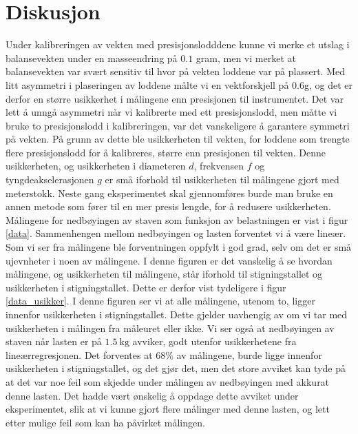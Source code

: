 \documentclass[%
 reprint,
 amsmath,amssymb,
 aps,
 norsk,
 booktabs
]{revtex4-1}
\begin{document}
\section{Diskusjon}
Under kalibreringen av vekten med presisjonslodddene kunne vi merke et utslag i balansevekten under en masseendring på $0.1$ gram, men vi merket at balansevekten var svært sensitiv til hvor på vekten loddene var på plassert. Med litt asymmetri i plaseringen av loddene målte vi en vektforskjell på $0.6$g, og det er derfor en større usikkerhet i målingene enn presisjonen til instrumentet. Det var lett å unngå asymmetri når vi kalibrerte med ett presisjonslodd, men måtte vi bruke to presisjonslodd i kalibreringen, var det vanskeligere å garantere symmetri på vekten. På grunn av dette ble usikkerheten til vekten, for loddene som trengte flere presisjonslodd for å kalibreres, større enn presisjonen til vekten. Denne usikkerheten, og usikkerheten i diameteren $d$, frekvensen $f$ og tyngdeakselerasjonen $g$ er små iforhold til usikkerheten til målingene gjort med meterstokk. Neste gang eksperimentet skal gjennomføres burde man bruke en annen metode som fører til en mer presis lengde, for å redusere usikkerheten.\\
Målingene for nedbøyingen av staven som funksjon av belastningen er vist i figur \vref{data}. Sammenhengen mellom nedbøyingen og lasten forventet vi å være lineær. Som vi ser fra målingene ble forventningen oppfylt i god grad, selv om det er små ujevnheter i noen av målingene. I denne figuren er det vanskelig å se hvordan målingene, og usikkerheten til målingene, står iforhold til stigningstallet og usikkerheten i stigningstallet. Dette er derfor vist tydeligere i figur \vref{data_usikker}. I denne figuren ser vi at alle målingene, utenom to, ligger innenfor usikkerheten i stigningstallet. Dette gjelder uavhengig av om vi tar med usikkerheten i målingen fra måleuret eller ikke. Vi ser også at nedbøyingen av staven når lasten er på $\SI{1.5}{\kilo\gram}$ avviker, godt utenfor usikkerhetene fra lineærregresjonen. Det forventes at $68\%$ av målingene, burde ligge innenfor usikkerheten i stigningstallet, og det gjør det, men det store avviket kan tyde på at det var noe feil som skjedde under målingen av nedbøyingen med akkurat denne lasten. Det hadde vært ønskelig å oppdage dette avviket under eksperimentet, slik at vi kunne gjort flere målinger med denne lasten, og lett etter mulige feil som kan ha påvirket målingen.\\
\end{document}
